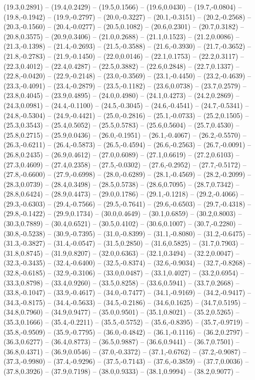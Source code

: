 \documentclass{SVnote}
\begin{document}
(19.3,0.2891) -- (19.4,0.2429) -- (19.5,0.1566) -- (19.6,0.0430) -- (19.7,-0.0804) -- (19.8,-0.1942) -- (19.9,-0.2797) -- (20.0,-0.3227) -- (20.1,-0.3151) -- (20.2,-0.2568) -- (20.3,-0.1560) -- (20.4,-0.0277) -- (20.5,0.1082) -- (20.6,0.2301) -- (20.7,0.3182) -- (20.8,0.3575) -- (20.9,0.3406) -- (21.0,0.2688) -- (21.1,0.1523) -- (21.2,0.0086) -- (21.3,-0.1398) -- (21.4,-0.2693) -- (21.5,-0.3588) -- (21.6,-0.3930) -- (21.7,-0.3652) -- (21.8,-0.2783) -- (21.9,-0.1450) -- (22.0,0.0146) -- (22.1,0.1753) -- (22.2,0.3117) -- (22.3,0.4012) -- (22.4,0.4287) -- (22.5,0.3882) -- (22.6,0.2848) -- (22.7,0.1337) -- (22.8,-0.0420) -- (22.9,-0.2148) -- (23.0,-0.3569) -- (23.1,-0.4450) -- (23.2,-0.4639) -- (23.3,-0.4091) -- (23.4,-0.2879) -- (23.5,-0.1182) -- (23.6,0.0738) -- (23.7,0.2579) -- (23.8,0.4045) -- (23.9,0.4895) -- (24.0,0.4980) -- (24.1,0.4273) -- (24.2,0.2869) -- (24.3,0.0981) -- (24.4,-0.1100) -- (24.5,-0.3045) -- (24.6,-0.4541) -- (24.7,-0.5341) -- (24.8,-0.5304) -- (24.9,-0.4421) -- (25.0,-0.2816) -- (25.1,-0.0733) -- (25.2,0.1505) -- (25.3,0.3543) -- (25.4,0.5052) -- (25.5,0.5783) -- (25.6,0.5604) -- (25.7,0.4530) -- (25.8,0.2715) -- (25.9,0.0436) -- (26.0,-0.1951) -- (26.1,-0.4067) -- (26.2,-0.5570) -- (26.3,-0.6211) -- (26.4,-0.5873) -- (26.5,-0.4594) -- (26.6,-0.2563) -- (26.7,-0.0091) -- (26.8,0.2435) -- (26.9,0.4612) -- (27.0,0.6089) -- (27.1,0.6619) -- (27.2,0.6103) -- (27.3,0.4609) -- (27.4,0.2358) -- (27.5,-0.0302) -- (27.6,-0.2952) -- (27.7,-0.5172) -- (27.8,-0.6600) -- (27.9,-0.6998) -- (28.0,-0.6289) -- (28.1,-0.4569) -- (28.2,-0.2099) -- (28.3,0.0739) -- (28.4,0.3498) -- (28.5,0.5738) -- (28.6,0.7095) -- (28.7,0.7342) -- (28.8,0.6424) -- (28.9,0.4473) -- (29.0,0.1786) -- (29.1,-0.1218) -- (29.2,-0.4066) -- (29.3,-0.6303) -- (29.4,-0.7566) -- (29.5,-0.7641) -- (29.6,-0.6503) -- (29.7,-0.4318) -- (29.8,-0.1422) -- (29.9,0.1734) -- (30.0,0.4649) -- (30.1,0.6859) -- (30.2,0.8003) -- (30.3,0.7889) -- (30.4,0.6521) -- (30.5,0.4102) -- (30.6,0.1007) -- (30.7,-0.2280) -- (30.8,-0.5238) -- (30.9,-0.7395) -- (31.0,-0.8399) -- (31.1,-0.8080) -- (31.2,-0.6475) -- (31.3,-0.3827) -- (31.4,-0.0547) -- (31.5,0.2850) -- (31.6,0.5825) -- (31.7,0.7903) -- (31.8,0.8745) -- (31.9,0.8207) -- (32.0,0.6363) -- (32.1,0.3494) -- (32.2,0.0047) -- (32.3,-0.3435) -- (32.4,-0.6400) -- (32.5,-0.8374) -- (32.6,-0.9034) -- (32.7,-0.8268) -- (32.8,-0.6185) -- (32.9,-0.3106) -- (33.0,0.0487) -- (33.1,0.4027) -- (33.2,0.6954) -- (33.3,0.8798) -- (33.4,0.9260) -- (33.5,0.8258) -- (33.6,0.5941) -- (33.7,0.2668) -- (33.8,-0.1047) -- (33.9,-0.4617) -- (34.0,-0.7477) -- (34.1,-0.9169) -- (34.2,-0.9417) -- (34.3,-0.8175) -- (34.4,-0.5633) -- (34.5,-0.2186) -- (34.6,0.1625) -- (34.7,0.5195) -- (34.8,0.7960) -- (34.9,0.9477) -- (35.0,0.9501) -- (35.1,0.8021) -- (35.2,0.5265) -- (35.3,0.1666) -- (35.4,-0.2211) -- (35.5,-0.5752) -- (35.6,-0.8395) -- (35.7,-0.9719) -- (35.8,-0.9509) -- (35.9,-0.7795) -- (36.0,-0.4842) -- (36.1,-0.1116) -- (36.2,0.2797) -- (36.3,0.6277) -- (36.4,0.8773) -- (36.5,0.9887) -- (36.6,0.9441) -- (36.7,0.7501) -- (36.8,0.4371) -- (36.9,0.0546) -- (37.0,-0.3372) -- (37.1,-0.6762) -- (37.2,-0.9087) -- (37.3,-0.9980) -- (37.4,-0.9296) -- (37.5,-0.7143) -- (37.6,-0.3859) -- (37.7,0.0036) -- (37.8,0.3926) -- (37.9,0.7198) -- (38.0,0.9333) -- (38.1,0.9994) -- (38.2,0.9077) -- 
\end{document}
